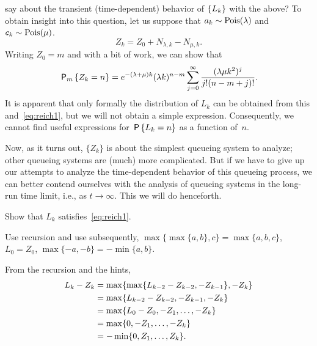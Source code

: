 \documentclass[queueing-book.tex]{subfiles}
\begin{document}
 say about the transient (time-dependent) behavior of $\{\L_k\}$ with the above?
To obtain insight into this question, let us suppose that $a_k\sim \Pois{\lambda}$ and $c_k \sim \Pois{\mu}$.
\begin{equation*}
 Z_k = Z_0+N_{\lambda, k} - N_{\mu, k}.
\end{equation*}
Writing $Z_0=m$ and with a bit of work, we can show that
\begin{equation}\label{eq:rw2}
 \PP{m}{Z_k=n}
= e^{-(\lambda+\mu)k} (\lambda k)^{n-m} \sum_{j=0}^\infty
\frac{(\lambda\mu k^2)^j} {j!(n-m+j)!}.
\end{equation}
It is apparent that only formally the distribution of $L_{k}$ can be obtained from this and~\cref{eq:reich1}, but we will not obtain a simple expression.
Consequently, we cannot find useful expressions for $\P{L_k=n}$ as a function of~$n$.

Now, as it turns out, $\{Z_k\}$ is about the simplest queueing system to analyze; other queueing systems are (much) more complicated.
But if we have to give up our attempts to analyze the time-dependent behavior of this queueing process, we can better contend ourselves with the analysis of queueing systems in the long-run time limit, i.e., as $t\to\infty$. This we will do henceforth.


\begin{exercise}\label{ex:l-133}
Show that $L_k$ satisfies~\cref{eq:reich1}.
\begin{hint}
  Use recursion and use subsequently,
$\max\{\max\{a,b\}, c\} = \max\{a,b,c\}$, $L_0 = Z_0$, $\max\{-a, -b \} = -\min\{a,b\}$.
\end{hint}
\begin{solution}
From the recursion and the hints,
\begin{equation*}
 \begin{split}
 L_k - Z_{k}
&= \max\{\max\{\L_{k-2} - Z_{k-2}, -Z_{k-1}\}, -Z_k\} \\
&= \max\{\L_{k-2} - Z_{k-2}, -Z_{k-1}, -Z_k\} \\
&= \max\{\L_{0} - Z_{0}, -Z_1, \ldots, -Z_k\} \\
&= \max\{0, -Z_1, \ldots, -Z_k\} \\
&= - \min\{0, Z_1, \ldots, Z_k\}.
 \end{split}
 \end{equation*}
\end{solution}
\end{exercise}
\end{document}
